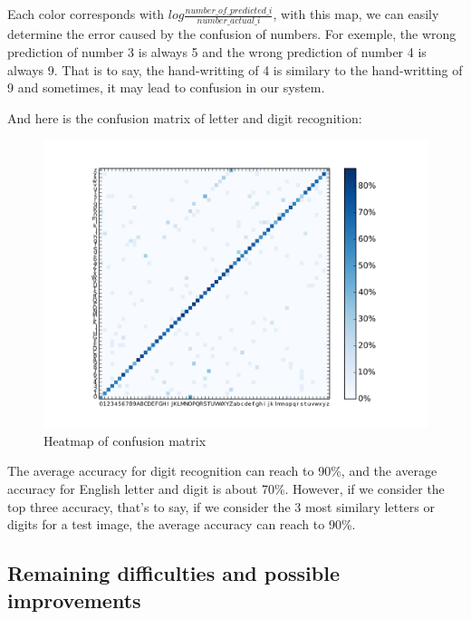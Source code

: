 \documentclass[paper=a4, french, 11pt]{scrartcl}
\begin{document}
Each color corresponds with $log\frac{number\_of\_predicted\_i}{number\_actual\_ i}$, with this map, we can easily determine the error caused by the confusion of numbers. For exemple, the wrong prediction of number 3 is always 5 and the wrong prediction of number 4 is always 9. That is to say, the hand-writting of 4 is similary to the hand-writting of 9 and sometimes, it may lead to confusion in our system.

And here is the confusion matrix of letter and digit recognition:

\begin{figure}[h]
\vspace{-1ex}
\begin{center}
   \includegraphics[width=1.0\linewidth]{Confusion_matrix_letter_digital.png}
\end{center}
\vspace{-3ex}
\caption{Heatmap of confusion matrix}
\label{fig:heatmap}
\end{figure}

The average accuracy for digit recognition can reach to 90\%, and the average accuracy for English letter and digit is about 70\%. However, if we consider the top three accuracy, that's to say, if we consider the 3 most similary letters or digits for a test image, the average accuracy can reach to 90\%.

\subsection{Remaining difficulties and possible improvements} \mbox{} \vspace{-0.5cm}
\end{document}
